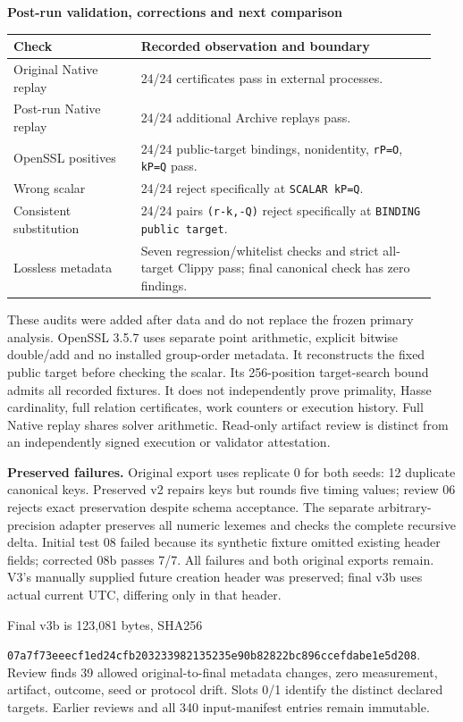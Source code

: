 \documentclass[10pt]{article}
\begin{document}
\newpage
{\Large\bfseries Post-run validation, corrections and next comparison}

\begin{tabular}{@{}p{0.29\linewidth}p{0.65\linewidth}@{}}\toprule
Check & Recorded observation and boundary\\\midrule
Original Native replay &24/24 certificates pass in external processes.\\
Post-run Native replay &24/24 additional Archive replays pass.\\
OpenSSL positives &24/24 public-target bindings, nonidentity, \texttt{rP=O}, \texttt{kP=Q} pass.\\
Wrong scalar &24/24 reject specifically at \texttt{SCALAR kP=Q}.\\
Consistent substitution &24/24 pairs \texttt{(r-k,-Q)} reject specifically at \texttt{BINDING public target}.\\
Lossless metadata &Seven regression/whitelist checks and strict all-target Clippy pass; final canonical check has zero findings.\\\bottomrule
\end{tabular}

These audits were added after data and do not replace the frozen primary
analysis. OpenSSL 3.5.7 uses separate point arithmetic, explicit bitwise
double/add and no installed group-order metadata. It reconstructs the fixed
public target before checking the scalar. Its 256-position target-search bound
admits all recorded fixtures. It does not independently prove primality,
Hasse cardinality, full relation certificates, work counters or execution history.
Full Native replay shares solver arithmetic. Read-only artifact review is
distinct from an independently signed execution or validator attestation.

\textbf{Preserved failures.} Original export uses replicate 0 for both seeds:
12 duplicate canonical keys. Preserved v2 repairs keys but rounds five timing
values; review 06 rejects exact preservation despite schema acceptance. The
separate arbitrary-precision adapter preserves all numeric lexemes and checks
the complete recursive delta. Initial test 08 failed because its synthetic
fixture omitted existing header fields; corrected 08b passes 7/7. All failures
and both original exports remain. V3's manually supplied future creation header
was preserved; final v3b uses actual current UTC, differing only in that header.

Final v3b is 123,081 bytes, SHA256\par
{\footnotesize\texttt{07a7f73eeecf1ed24cfb203233982135235e90b82822bc896ccefdabe1e5d208}.}
Review finds 39 allowed original-to-final metadata changes, zero measurement,
artifact, outcome, seed or protocol drift. Slots 0/1 identify the distinct declared
targets. Earlier reviews and all 340 input-manifest entries remain immutable.
\end{document}
